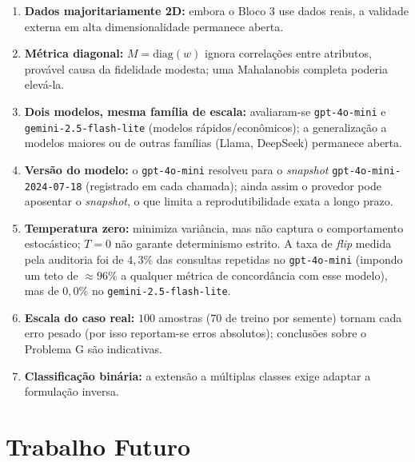 \documentclass[12pt,a4paper]{article}
\begin{document}
\begin{enumerate}
  \item \textbf{Dados majoritariamente 2D:} embora o Bloco 3 use dados reais, a validade
    externa em alta dimensionalidade permanece aberta.
  \item \textbf{Métrica diagonal:} $M=\mathrm{diag}(w)$ ignora correlações entre
    atributos, provável causa da fidelidade modesta; uma Mahalanobis completa poderia
    elevá-la.
  \item \textbf{Dois modelos, mesma família de escala:} avaliaram-se \texttt{gpt-4o-mini} e
    \texttt{gemini-2.5-flash-lite} (modelos rápidos/econômicos); a generalização a modelos
    maiores ou de outras famílias (Llama, DeepSeek) permanece aberta.
  \item \textbf{Versão do modelo:} o \texttt{gpt-4o-mini} resolveu para o \emph{snapshot}
    \texttt{gpt-4o-mini-2024-07-18} (registrado em cada chamada); ainda assim o provedor pode
    aposentar o \emph{snapshot}, o que limita a reprodutibilidade exata a longo prazo.
  \item \textbf{Temperatura zero:} minimiza variância, mas não captura o comportamento
    estocástico; $T=0$ não garante determinismo estrito. A taxa de \emph{flip} medida pela
    auditoria foi de $4{,}3\%$ das consultas repetidas no \texttt{gpt-4o-mini} (impondo um
    teto de $\approx 96\%$ a qualquer métrica de concordância com esse modelo), mas de
    $0{,}0\%$ no \texttt{gemini-2.5-flash-lite}.
  \item \textbf{Escala do caso real:} $100$ amostras ($70$ de treino por semente) tornam
    cada erro pesado (por
    isso reportam-se erros absolutos); conclusões sobre o Problema G são indicativas.
  \item \textbf{Classificação binária:} a extensão a múltiplas classes exige adaptar a
    formulação inversa.
\end{enumerate}

\section{Trabalho Futuro}
\label{sec:futuro}
\end{document}
